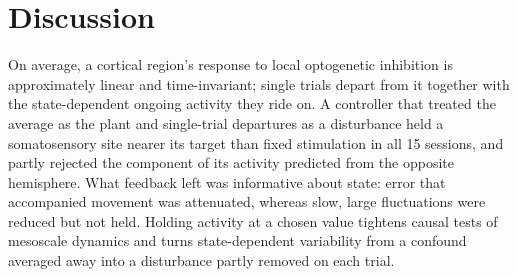 \section*{Discussion}

On average, a cortical region's response to local optogenetic inhibition is approximately linear and time-invariant; single trials depart from it together with the state-dependent ongoing activity they ride on. A controller that treated the average as the plant and single-trial departures as a disturbance held a somatosensory site nearer its target than fixed stimulation in all 15 sessions, and partly rejected the component of its activity predicted from the opposite hemisphere. What feedback left was informative about state: error that accompanied movement was attenuated, whereas slow, large fluctuations were reduced but not held. Holding activity at a chosen value tightens causal tests of mesoscale dynamics and turns state-dependent variability from a confound averaged away into a disturbance partly removed on each trial.

